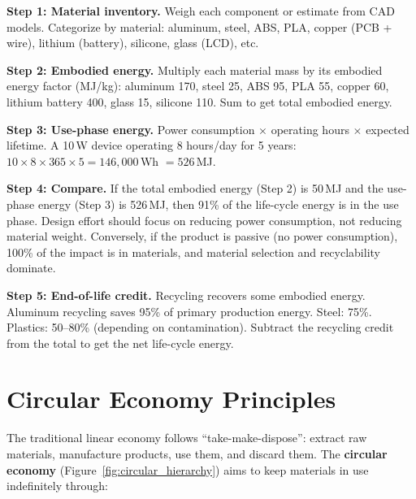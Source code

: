 \textbf{Step 1: Material inventory.} Weigh each component or estimate from CAD models. Categorize by material: aluminum, steel, ABS, PLA, copper (PCB + wire), lithium (battery), silicone, glass (LCD), etc.

\textbf{Step 2: Embodied energy.} Multiply each material mass by its embodied energy factor (MJ/kg): aluminum 170, steel 25, ABS 95, PLA 55, copper 60, lithium battery 400, glass 15, silicone 110. Sum to get total embodied energy.

\textbf{Step 3: Use-phase energy.} Power consumption $\times$ operating hours $\times$ expected lifetime. A 10\,W device operating 8 hours/day for 5 years: $10 \times 8 \times 365 \times 5 = 146{,}000$\,Wh $= 526$\,MJ.

\textbf{Step 4: Compare.} If the total embodied energy (Step 2) is 50\,MJ and the use-phase energy (Step 3) is 526\,MJ, then 91\% of the life-cycle energy is in the use phase. Design effort should focus on reducing power consumption, not reducing material weight. Conversely, if the product is passive (no power consumption), 100\% of the impact is in materials, and material selection and recyclability dominate.

\textbf{Step 5: End-of-life credit.} Recycling recovers some embodied energy. Aluminum recycling saves 95\% of primary production energy. Steel: 75\%. Plastics: 50--80\% (depending on contamination). Subtract the recycling credit from the total to get the net life-cycle energy.

\section{Circular Economy Principles}
The traditional linear economy follows ``take-make-dispose'': extract raw materials, manufacture products, use them, and discard them. The \textbf{circular economy} (Figure~\ref{fig:circular_hierarchy}) aims to keep materials in use indefinitely through:

